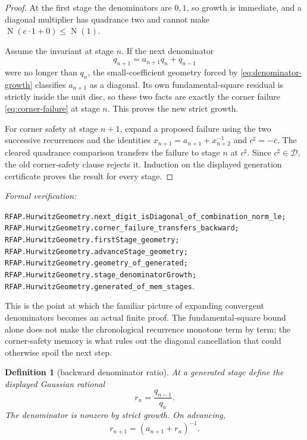 \documentclass[11pt]{article}
\newtheorem{definition}[definition]{Definition}
\newcommand{\Norm}[1]{\operatorname{N}\!\left(#1\right)}
\newcommand{\leanref}[1]{\par\smallskip\noindent
  \emph{Formal verification:}\par\nobreak
  {\raggedright\nolinkurl{#1}.\par}}
\begin{document}
\begin{proof}
At the first stage the denominators are $0,1$, so growth is immediate, and a
diagonal multiplier has quadrance two and cannot make
$\Norm{c\cdot1+0}\le\Norm1$.

Assume the invariant at stage $n$.  If the next denominator
\[
                         q_{n+1}=a_{n+1}q_n+q_{n-1}
\]
were no longer than $q_n$, the small-coefficient geometry forced by
\eqref{eq:denominator-growth} classifies $a_{n+1}$ as a diagonal.  Its own
fundamental-square residual is strictly inside the unit disc, so these two
facts are exactly the corner failure \eqref{eq:corner-failure} at stage $n$.
This proves the new strict growth.

For corner safety at stage $n+1$, expand a proposed failure using the two
successive recurrences and the identities
$x_{n+1}=a_{n+1}+x_{n+2}^{-1}$ and
$c^\sharp=-\overline c$.  The cleared quadrance comparison transfers the
failure to stage $n$ at $c^\sharp$.  Since
$c^\sharp\in\mathcal D$, the old corner-safety clause rejects it.  Induction
on the displayed generation certificate proves the result for every stage.
\end{proof}

\leanref{RFAP.HurwitzGeometry.next_digit_isDiagonal_of_combination_norm_le;
RFAP.HurwitzGeometry.corner_failure_transfers_backward;
RFAP.HurwitzGeometry.firstStage_geometry;
RFAP.HurwitzGeometry.advanceStage_geometry;
RFAP.HurwitzGeometry.geometry_of_generated;
RFAP.HurwitzGeometry.stage_denominatorGrowth;
RFAP.HurwitzGeometry.generated_of_mem_stages}

This is the point at which the familiar picture of expanding convergent
denominators becomes an actual finite proof.  The fundamental-square bound
alone does not make the chronological recurrence monotone term by term;
the corner-safety memory is what rules out the diagonal cancellation that
could otherwise spoil the next step.

\begin{definition}[backward denominator ratio]
\label{def:backward-ratio}
At a generated stage define the displayed Gaussian rational
\begin{equation}
\label{eq:backward-ratio}
                          r_n=\frac{q_{n-1}}{q_n}.
\end{equation}
The denominator is nonzero by strict growth.  On advancing,
\begin{equation}
\label{eq:backward-ratio-recurrence}
                         r_{n+1}=(a_{n+1}+r_n)^{-1}.
\end{equation}
\end{definition}
\end{document}
